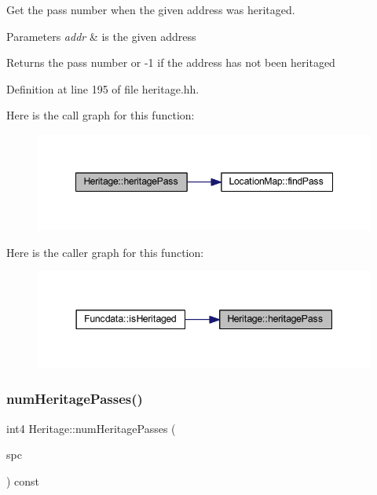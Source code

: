 Get the pass number when the given address was heritaged. 


\begin{DoxyParams}{Parameters}
{\em addr} & is the given address \\
\hline
\end{DoxyParams}
\begin{DoxyReturn}{Returns}
the pass number or -\/1 if the address has not been heritaged 
\end{DoxyReturn}


Definition at line 195 of file heritage.\+hh.

Here is the call graph for this function\+:
\nopagebreak
\begin{figure}[H]
\begin{center}
\leavevmode
\includegraphics[width=348pt]{class_heritage_a0a0dc0ad60e23c2901675abf1e1371ac_cgraph}
\end{center}
\end{figure}
Here is the caller graph for this function\+:
\nopagebreak
\begin{figure}[H]
\begin{center}
\leavevmode
\includegraphics[width=344pt]{class_heritage_a0a0dc0ad60e23c2901675abf1e1371ac_icgraph}
\end{center}
\end{figure}
\mbox{\label{class_heritage_ad5576d24243e351ea478fe5b1174370b}} 
\subsubsection{\texorpdfstring{numHeritagePasses()}{numHeritagePasses()}}
{\footnotesize\ttfamily int4 Heritage\+::num\+Heritage\+Passes (\begin{DoxyParamCaption}\item[{\mbox{\hyperlink{class_addr_space}{Addr\+Space}} $\ast$}]{spc }\end{DoxyParamCaption}) const}



